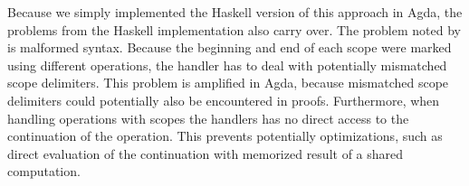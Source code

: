 Because we simply implemented the Haskell version of this approach in Agda, the
problems from the Haskell implementation also carry over.
The problem noted by \textcite{DBLP:conf/haskell/WuSH14} is malformed syntax.
Because the beginning and end of each scope were marked using different
operations, the handler has to deal with potentially mismatched scope delimiters.
This problem is amplified in Agda, because mismatched scope delimiters could
potentially also be encountered in proofs.
Furthermore, when handling operations with scopes the handlers has no direct
access to the continuation of the operation.
This prevents potentially optimizations, such as direct evaluation of the
continuation with memorized result of a shared computation.